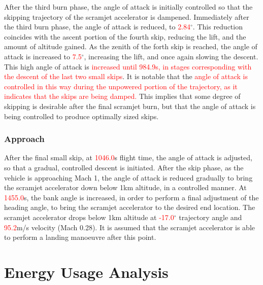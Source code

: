 After the third burn phase, the angle of attack is initially controlled so that the skipping trajectory of the scramjet accelerator is dampened.
Immediately after the third burn phase, the angle of attack is reduced, to \textcolor{red}{2.84}$^\circ$. This reduction coincides with the ascent portion of the fourth skip, reducing the lift, and the amount of altitude gained. 
As the zenith of the forth skip is reached, the angle of attack is increased to \textcolor{red}{7.5}$^\circ$, increasing the lift, and once again slowing the descent. 
This high angle of attack is \textcolor{red}{increased until 984.9s, in stages corresponding with the descent of the last two small skips}.
It is notable that the \textcolor{red}{angle of attack is controlled in this way during the unpowered portion of the trajectory, as it indicates that the skips are being damped.} This implies that some degree of skipping is desirable after the final scramjet burn, but that the angle of attack is being controlled to produce optimally sized skips. 

\subsubsection{Approach}

After the final small skip, at \textcolor{red}{1046.0}s flight time, the angle of attack is adjusted, so that a gradual, controlled descent is initiated. 
After the skip phase, as the vehicle is approaching Mach 1, the angle of attack is reduced gradually to bring the scramjet accelerator down below 1km altitude, in a controlled manner. At \textcolor{red}{1455.0}s, the bank angle is increased, in order to perform a final adjustment of the heading angle, to bring the scramjet accelerator to the desired end location. 
The scramjet accelerator drops below 1km altitude at \textcolor{red}{-17.0}$^\circ$ trajectory angle and \textcolor{red}{95.2}m/s velocity (Mach 0.28). It is assumed that the scramjet accelerator is able to perform a landing manoeuvre after this point. 





\section{Energy Usage Analysis}


